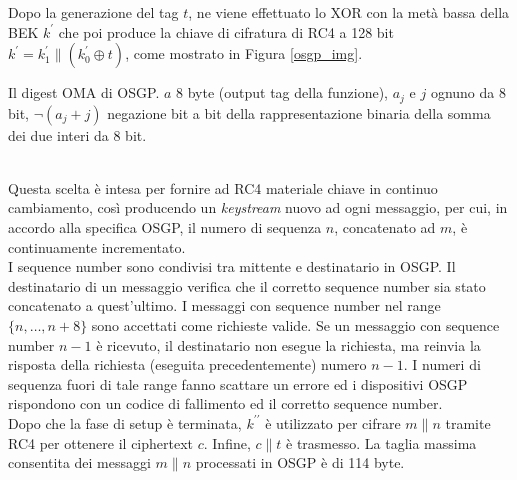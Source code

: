 Dopo la generazione del tag $t$, ne viene effettuato lo XOR con la metà bassa della BEK $k^\prime$ che poi produce la chiave di cifratura di RC4 a 128 bit $k^{\prime} = k^\prime_1 \| (k^\prime_0 \oplus t)$, come mostrato in Figura \ref{osgp_img}.
\begin{algorithm}[H]
\caption{Il digest OMA di OSGP. $a$ 8 byte (output tag della funzione), $a_j$ e $j$ ognuno da 8 bit, $\neg(a_j+j)$ negazione bit a bit della rappresentazione binaria della somma dei due interi da 8 bit.}
\label{oma_algo1}
\end{algorithm}\mbox{}\\
Questa scelta è intesa per fornire ad RC4 materiale chiave in continuo cambiamento, così producendo un \textit{keystream} nuovo ad ogni messaggio, per cui, in accordo alla specifica OSGP, il numero di sequenza $n$, concatenato ad $m$, è continuamente incrementato.\\
I sequence number sono condivisi tra mittente e destinatario in OSGP. Il destinatario di un messaggio verifica che il corretto sequence number sia stato concatenato a quest'ultimo. I messaggi con sequence number nel range $\{n, \ldots, n+8\}$ sono accettati come richieste valide. Se un messaggio con sequence number $n-1$ è ricevuto, il destinatario non esegue la richiesta, ma reinvia la risposta della richiesta (eseguita precedentemente) numero $n-1$. I numeri di sequenza fuori di tale range fanno scattare un errore ed i dispositivi OSGP rispondono con un codice di fallimento ed il corretto sequence number.\\
Dopo che la fase di setup è terminata, $k^{\prime\prime}$ è utilizzato per cifrare $m\|n$ tramite RC4 per ottenere il ciphertext $c$. Infine, $c\|t$ è trasmesso. La taglia massima consentita dei messaggi $m\|n$ processati in OSGP è di 114 byte.
\newpage
